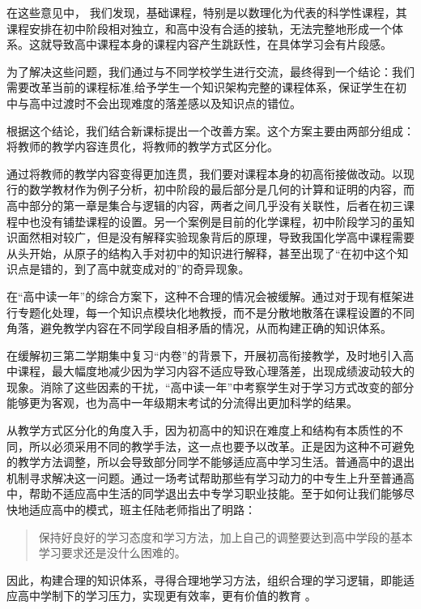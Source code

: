 \documentclass[12pt,UTF8]{ctexart}
\begin{document}
\par {
	在这些意见中，
	我们发现，基础课程，特别是以数理化为代表的科学性课程，其课程安排在初中阶段相对独立，和高中没有合适的接轨，无法完整地形成一个体系。这就导致高中课程本身的课程内容产生跳跃性，在具体学习会有片段感。
}
\par {
	
	为了解决这些问题，我们通过与不同学校学生进行交流，最终得到一个结论：我们需要改革当前的课程标准,给予学生一个知识架构完整的课程体系，保证学生在初中与高中过渡时不会出现难度的落差感以及知识点的错位。
}
\par {
	根据这个结论，我们结合新课标提出一个改善方案。这个方案主要由两部分组成：将教师的教学内容连贯化，将教师的教学方式区分化。
}
\par {
	
	通过将教师的教学内容变得更加连贯，我们要对课程本身的初高衔接做改动。以现行的数学教材作为例子分析，初中阶段的最后部分是几何的计算和证明的内容，而高中部分的第一章是集合与逻辑的内容，两者之间几乎没有关联性，后者在初三课程中也没有铺垫课程的设置。另一个案例是目前的化学课程，初中阶段学习的虽知识面然相对较广，但是没有解释实验现象背后的原理，导致我国化学高中课程需要从头开始，从原子的结构入手对初中的知识进行解释，甚至出现了“在初中这个知识点是错的，到了高中就变成对的”的奇异现象。
}
\par {
	
	在“高中读一年”的综合方案下，这种不合理的情况会被缓解。通过对于现有框架进行专题化处理，每一个知识点模块化地教授，而不是分散地散落在课程设置的不同角落，避免教学内容在不同学段自相矛盾的情况，从而构建正确的知识体系。
}
\par {
	
	在缓解初三第二学期集中复习“内卷”的背景下，开展初高衔接教学，及时地引入高中课程，最大幅度地减少因为学习内容不适应导致心理落差，出现成绩波动较大的现象。消除了这些因素的干扰，“高中读一年”中考察学生对于学习方式改变的部分能够更为客观，也为高中一年级期末考试的分流得出更加科学的结果。
}
\par {
	
	从教学方式区分化的角度入手，因为初高中的知识在难度上和结构有本质性的不同，所以必须采用不同的教学手法，这一点也要予以改革。正是因为这种不可避免的教学方法调整，所以会导致部分同学不能够适应高中学习生活。普通高中的退出机制寻求解决这一问题。通过一场考试帮助那些有学习动力的中专生上升至普通高中，帮助不适应高中生活的同学退出去中专学习职业技能。至于如何让我们能够尽快地适应高中的模式，班主任陆老师指出了明路：
	\begin{quote}
		\kaishu 保持好良好的学习态度和学习方法，加上自己的调整要达到高中学段的基本学习要求还是没什么困难的。
	\end{quote}
}
\par {
	因此，构建合理的知识体系，寻得合理地学习方法，组织合理的学习逻辑，即能适应高中学制下的学习压力，实现更有效率，更有价值的教育 。
}
\end{document}
